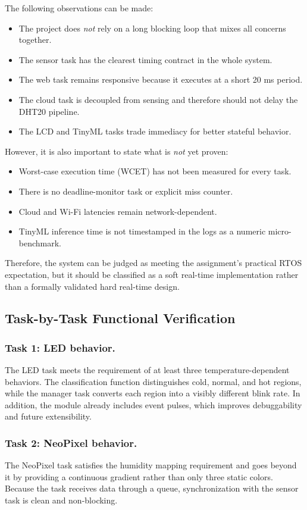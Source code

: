 The following observations can be made:
\begin{itemize}
  \item The project does \emph{not} rely on a long blocking loop that mixes all
  concerns together.
  \item The sensor task has the clearest timing contract in the whole system.
  \item The web task remains responsive because it executes at a short
  20 ms period.
  \item The cloud task is decoupled from sensing and therefore should not delay
  the DHT20 pipeline.
  \item The LCD and TinyML tasks trade immediacy for better stateful behavior.
\end{itemize}

However, it is also important to state what is \emph{not} yet proven:
\begin{itemize}
  \item Worst-case execution time (WCET) has not been measured for every task.
  \item There is no deadline-monitor task or explicit miss counter.
  \item Cloud and Wi-Fi latencies remain network-dependent.
  \item TinyML inference time is not timestamped in the logs as a numeric
  micro-benchmark.
\end{itemize}

Therefore, the system can be judged as meeting the assignment's practical RTOS
expectation, but it should be classified as a soft real-time implementation
rather than a formally validated hard real-time design.

\subsection{Task-by-Task Functional Verification}
\subsubsection*{Task 1: LED behavior.}
The LED task meets the requirement of at least three temperature-dependent
behaviors. The classification function distinguishes cold, normal, and hot
regions, while the manager task converts each region into a visibly different
blink rate. In addition, the module already includes event pulses, which
improves debuggability and future extensibility.

\subsubsection*{Task 2: NeoPixel behavior.}
The NeoPixel task satisfies the humidity mapping requirement and goes beyond it
by providing a continuous gradient rather than only three static colors. Because
the task receives data through a queue, synchronization with the sensor task is
clean and non-blocking.

